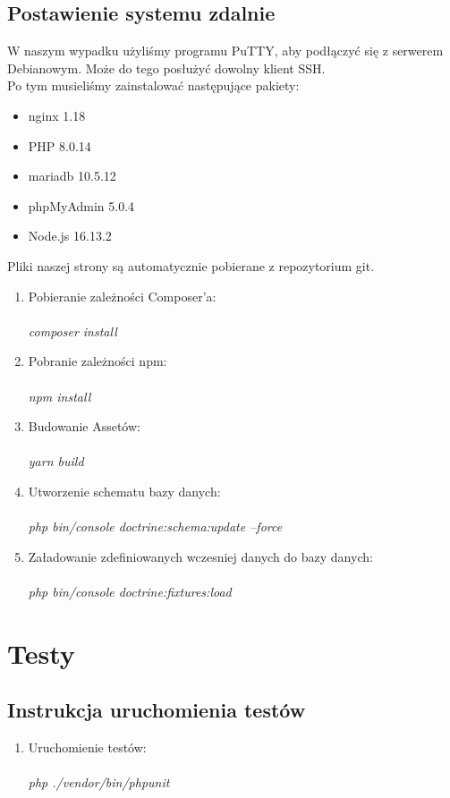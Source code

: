 \documentclass{article}
\begin{document}
\subsection{Postawienie systemu zdalnie}
W naszym wypadku użyliśmy programu PuTTY, aby podłączyć się z serwerem Debianowym. Może do tego posłużyć dowolny klient SSH.\\
Po tym musieliśmy zainstalować następujące pakiety:
\begin{itemize}
\item nginx 1.18
\item PHP 8.0.14
\item mariadb 10.5.12
\item phpMyAdmin 5.0.4
\item Node.js 16.13.2
\end{itemize}
Pliki naszej strony są automatycznie pobierane z repozytorium git.
\begin{enumerate}
\item Pobieranie zależności Composer'a: \\\\
 \emph{composer install
} \\
 \item Pobranie zależności npm:\\\\
 \emph{npm install
} \\
 \item Budowanie Assetów: \\\\
 \emph{yarn build
} \\
 \item Utworzenie schematu bazy danych: \\\\
 \emph{php bin/console doctrine:schema:update --force
} \\
 \item Załadowanie zdefiniowanych wczesniej danych do bazy danych: \\\\
 \emph{php bin/console doctrine:fixtures:load
} \\

  \end{enumerate}


\section{Testy}
\subsection{Instrukcja uruchomienia testów}
\begin{enumerate}
    \item Uruchomienie testów: \\\\
    \emph{ php ./vendor/bin/phpunit
} \\
    \end{enumerate}
\end{document}
